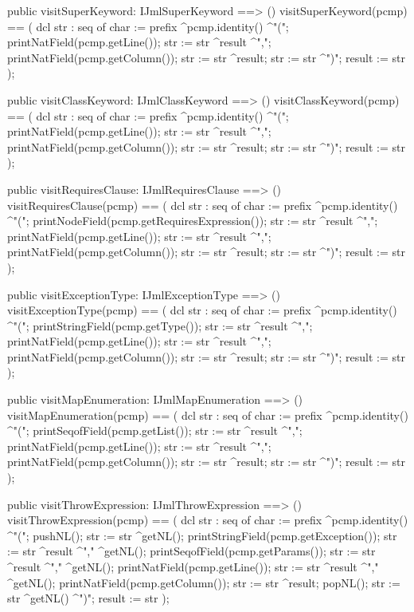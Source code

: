 \begin{vdm_al}
  public visitSuperKeyword: IJmlSuperKeyword ==> ()
  visitSuperKeyword(pcmp) ==
    ( dcl str : seq of char := prefix ^pcmp.identity() ^"(";
      printNatField(pcmp.getLine());
      str := str ^result ^",";
      printNatField(pcmp.getColumn());
      str := str ^result;
      str := str ^")";
      result := str );

  public visitClassKeyword: IJmlClassKeyword ==> ()
  visitClassKeyword(pcmp) ==
    ( dcl str : seq of char := prefix ^pcmp.identity() ^"(";
      printNatField(pcmp.getLine());
      str := str ^result ^",";
      printNatField(pcmp.getColumn());
      str := str ^result;
      str := str ^")";
      result := str );

  public visitRequiresClause: IJmlRequiresClause ==> ()
  visitRequiresClause(pcmp) ==
    ( dcl str : seq of char := prefix ^pcmp.identity() ^"(";
      printNodeField(pcmp.getRequiresExpression());
      str := str ^result ^",";
      printNatField(pcmp.getLine());
      str := str ^result ^",";
      printNatField(pcmp.getColumn());
      str := str ^result;
      str := str ^")";
      result := str );

  public visitExceptionType: IJmlExceptionType ==> ()
  visitExceptionType(pcmp) ==
    ( dcl str : seq of char := prefix ^pcmp.identity() ^"(";
      printStringField(pcmp.getType());
      str := str ^result ^",";
      printNatField(pcmp.getLine());
      str := str ^result ^",";
      printNatField(pcmp.getColumn());
      str := str ^result;
      str := str ^")";
      result := str );

  public visitMapEnumeration: IJmlMapEnumeration ==> ()
  visitMapEnumeration(pcmp) ==
    ( dcl str : seq of char := prefix ^pcmp.identity() ^"(";
      printSeqofField(pcmp.getList());
      str := str ^result ^",";
      printNatField(pcmp.getLine());
      str := str ^result ^",";
      printNatField(pcmp.getColumn());
      str := str ^result;
      str := str ^")";
      result := str );

  public visitThrowExpression: IJmlThrowExpression ==> ()
  visitThrowExpression(pcmp) ==
    ( dcl str : seq of char := prefix ^pcmp.identity() ^"(";
      pushNL();
      str := str ^getNL();
      printStringField(pcmp.getException());
      str := str ^result ^"," ^getNL();
      printSeqofField(pcmp.getParams());
      str := str ^result ^"," ^getNL();
      printNatField(pcmp.getLine());
      str := str ^result ^"," ^getNL();
      printNatField(pcmp.getColumn());
      str := str ^result;
      popNL();
      str := str ^getNL() ^")";
      result := str );


\end{vdm_al}

